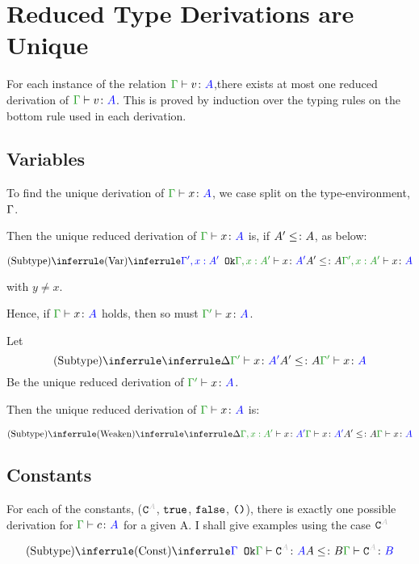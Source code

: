 \documentclass{report}
\begin{document}
\section{Reduced Type Derivations are Unique}
For each instance of the relation $\gtyperelation{v}{A}$,there exists at most one reduced derivation of  $\gtyperelation{v}{A}$. This is proved by induction over the typing rules on the bottom rule used in each derivation.
\subsection{Variables}
To find the unique derivation of $\gtyperelation{x}{A}$, we case split on the type-environment, $\Gamma$.

Then the unique reduced derivation of $\gtyperelation{x}{A}$ is, if $A' \leq\colon A$, as below:

\begin{equation}
    \ntreeruleII{Subtype}{\ntreeruleI{Var}{\ok{\G', x: A'}}{\typerelation{\G,x: A'}{x}{A'}}}{ A' \subtype A}{\typerelation{\G', x: A'}{x}{A}}
\end{equation}

 with $y \neq x$.

Hence, if $\gtyperelation{x}{A}$ holds, then so must $\typerelation{\G'}{x}{A}$.

Let 
\begin{equation}
    \deltavrule{\G'}{x}{A'}{A}
\end{equation}
Be the  unique reduced derivation of $\typerelation{\G'}{x}{A}$.

Then the unique reduced derivation of $\gtyperelation{x}{A}$ is:


\begin{equation}
    \ntreeruleII{Subtype}{
        \ntreeruleI{Weaken}{
            \treeruleI{\D}{\typerelation{\G, x: A'}{x}{A'}}
        }{\gtyperelation{x}{A'}}   
    }{ A' \subtype A
    }{\gtyperelation{x}{A}}
\end{equation}

\subsection{Constants}
For each of the constants, ($\const{A}$, $\texttt{true}$, $\texttt{false}$, $\texttt{()}$), there is exactly one possible derivation for $\typerelation{\G}{c}{A}$ for a given A. I shall give examples using the case $\const{A}$


$$
    \ntreeruleII{Subtype}{\truleconst}{ A \subtype B}{\gtyperelation{\const{A}}{B}}
$$
\end{document}
